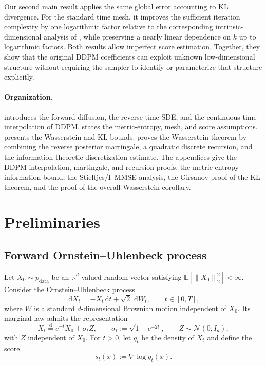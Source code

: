 \documentclass[11pt]{article}
\theoremstyle{definition}
\newcommand{\R}{\mathbb{R}}
\newcommand{\E}{\mathbb{E}}
\newcommand{\N}{\mathcal{N}}
\newcommand{\Id}{I_d}
\newcommand{\pdata}{p_{\mathrm{data}}}
\newcommand{\norm}[1]{\left\lVert #1\right\rVert_2}
\newcommand{\dd}{\,\mathrm{d}}
\begin{document}
Our second main result applies the same global error accounting to KL
divergence. For the standard time mesh, it improves the sufficient
iteration complexity by one logarithmic factor relative to the
corresponding intrinsic-dimensional analysis of
\citet{huang2026optimal}, while preserving a nearly linear dependence
on $k$ up to logarithmic factors. Both results allow imperfect score
estimation. Together, they show that the original DDPM coefficients
can exploit unknown low-dimensional structure without requiring the
sampler to identify or parameterize that structure explicitly.

\paragraph{Organization.}
 introduces the forward diffusion, the reverse-time SDE, and the continuous-time interpolation of DDPM.  states the metric-entropy, mesh, and score assumptions.  presents the Wasserstein and KL bounds.  proves the Wasserstein theorem by combining the reverse posterior martingale, a quadratic discrete recursion, and the information-theoretic discretization estimate. The appendices give the DDPM-interpolation, martingale, and recursion proofs, the metric-entropy information bound, the Stieltjes/I--MMSE analysis, the Girsanov proof of the KL theorem, and the proof of the overall Wasserstein corollary.

\section{Preliminaries}
\label{sec:setup}

\subsection{Forward Ornstein--Uhlenbeck process}

Let $X_0\sim\pdata$ be an $\R^d$-valued random vector satisfying $\E\left[\norm{X_0}^2\right]<\infty$. Consider the Ornstein--Uhlenbeck process
\begin{equation}
    \dd X_t=-X_t\dd t+\sqrt{2}\,\dd W_t,
    \qquad t\in[0,T],
    \label{eq:forward-sde}
\end{equation}
where $W$ is a standard $d$-dimensional Brownian motion independent of $X_0$. Its marginal law admits the representation
\begin{equation}
    X_t\overset{\mathrm d}=e^{-t}X_0+\sigma_t Z,
    \qquad
    \sigma_t:=\sqrt{1-e^{-2t}},
    \qquad Z\sim\N(0,\Id),
    \label{eq:forward-marginal}
\end{equation}
with $Z$ independent of $X_0$. For $t>0$, let $q_t$ be the density of $X_t$ and define the score
\begin{equation}
    s_t(x):=\nabla\log q_t(x).
    \label{eq:true-score}
\end{equation}
\end{document}
